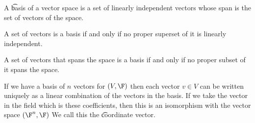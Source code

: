 
A \t{basis} of a vector space is a set of linearly independent vectors whose span is the set of vectors of the space.


\begin{prop}
  A set of vectors is a basis if and only if no proper superset of it is linearly independent.
\end{prop}

\begin{prop}
  A set of vectors that spans the space is a basis if and only if no proper subset of it spans the space.
\end{prop}

If we have a basis of $n$ vectors for $(V, \F)$ then each vector $v \in V$ can be written uniquely as a linear combination of the vectors in the basis.
If we take the vector in the field which is these coefficients, then this is an isomorphism with the vector space $(\F^n, \F)$
We call this the \t{coordinate vector}.

